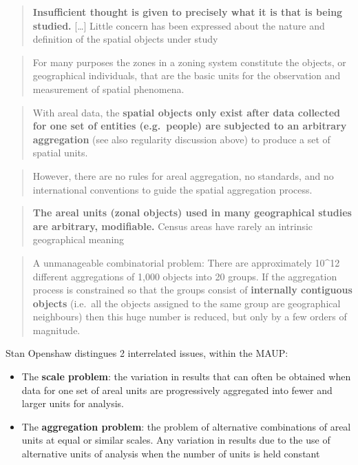 \documentclass[
  letterpaper,
  DIV=11,
  numbers=noendperiod]{scrreprt}
\providecommand{\tightlist}{%
  \setlength{\itemsep}{0pt}\setlength{\parskip}{0pt}}\usepackage{longtable,booktabs,array}
\begin{document}
\begin{quote}
\textbf{Insufficient thought is given to precisely what it is that is
being studied.} {[}\ldots{]} Little concern has been expressed about the
nature and definition of the spatial objects under study
\end{quote}

\begin{quote}
For many purposes the zones in a zoning system constitute the objects,
or geographical individuals, that are the basic units for the
observation and measurement of spatial phenomena.
\end{quote}

\begin{quote}
With areal data, the \textbf{spatial objects only exist after data
collected for one set of entities (e.g.~people) are subjected to an
arbitrary aggregation} (see also regularity discussion above) to produce
a set of spatial units.
\end{quote}

\begin{quote}
However, there are no rules for areal aggregation, no standards, and no
international conventions to guide the spatial aggregation process.
\end{quote}

\begin{quote}
\textbf{The areal units (zonal objects) used in many geographical
studies are arbitrary, modifiable.} Census areas have rarely an
intrinsic geographical meaning
\end{quote}

\begin{quote}
A unmanageable combinatorial problem: There are approximately 10\^{}12
different aggregations of 1,000 objects into 20 groups. If the
aggregation process is constrained so that the groups consist of
\textbf{internally contiguous objects} (i.e.~all the objects assigned to
the same group are geographical neighbours) then this huge number is
reduced, but only by a few orders of magnitude.
\end{quote}

Stan Openshaw distingues 2 interrelated issues, within the MAUP:

\begin{itemize}
\tightlist
\item
  The \textbf{scale problem}: the variation in results that can often be
  obtained when data for one set of areal units are progressively
  aggregated into fewer and larger units for analysis.
\item
  The \textbf{aggregation problem}: the problem of alternative
  combinations of areal units at equal or similar scales. Any variation
  in results due to the use of alternative units of analysis when the
  number of units is held constant
\end{itemize}
\end{document}
